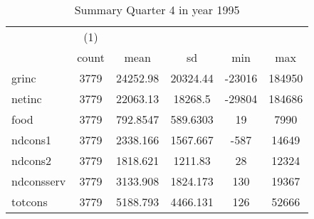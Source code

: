 \begin{table}[htbp]\centering
\def\sym#1{\ifmmode^{#1}\else\(^{#1}\)\fi}
\caption{Summary Quarter 4 in year 1995 \label{sum\_Q4\_y1995}}
\begin{tabular}{l*{1}{ccccc}}
\hline\hline
            &\multicolumn{1}{c}{(1)}&            &            &            &            \\
            &       count&        mean&          sd&         min&         max\\
\hline
grinc       &        3779&    24252.98&    20324.44&      -23016&      184950\\
netinc      &        3779&    22063.13&     18268.5&      -29804&      184686\\
food        &        3779&    792.8547&    589.6303&          19&        7990\\
ndcons1     &        3779&    2338.166&    1567.667&        -587&       14649\\
ndcons2     &        3779&    1818.621&     1211.83&          28&       12324\\
ndconsserv  &        3779&    3133.908&    1824.173&         130&       19367\\
totcons     &        3779&    5188.793&    4466.131&         126&       52666\\
\hline\hline
\end{tabular}
\end{table}
